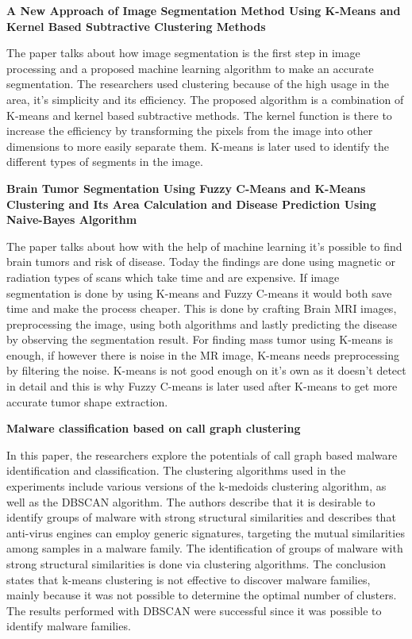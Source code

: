 \documentclass[a4paper]{article}
\begin{document}
\textbf{A New Approach of Image Segmentation Method Using K-Means and
Kernel Based Subtractive Clustering Methods}\cite{imageSeg}

The paper talks about how image segmentation is the first step in image processing and a proposed machine learning algorithm to make an accurate segmentation. The researchers used clustering because of the high usage in the area, it's simplicity and its efficiency. The proposed algorithm is a combination of K-means and kernel based subtractive methods. The kernel function is there to increase the efficiency by transforming the pixels from the image into other dimensions to more easily separate them. K-means is later used to identify the different types of segments in the image.

\newpage
\textbf{Brain Tumor Segmentation Using Fuzzy
C-Means and K-Means Clustering and Its
Area Calculation and Disease Prediction Using
Naive-Bayes Algorithm}\cite{imageSegBrain}

The paper talks about how with the help of machine learning it's possible to find brain tumors and risk of disease. Today the findings are done using magnetic or radiation types of scans which take time and are expensive. If image segmentation is done by using K-means and Fuzzy C-means it would both save time and make the process cheaper. This is done by crafting Brain MRI images, preprocessing the image, using both algorithms and lastly predicting the disease by observing the segmentation result. For finding mass tumor using K-means is enough, if however there is noise in the MR image, K-means needs preprocessing by filtering the noise. K-means is not good enough on it's own as it doesn't detect in detail and this is why Fuzzy C-means is later used after K-means to get more accurate tumor shape extraction.

\textbf{Malware classification based on call graph clustering}\cite{Kinable2011MalwareCB}

In this paper, the researchers explore the potentials of call graph based
malware identification and classification. The clustering algorithms used in the experiments include various versions of the k-medoids clustering algorithm, as well as the DBSCAN algorithm. The authors describe that it is desirable to identify groups of malware with strong structural similarities and describes that anti-virus engines can employ generic signatures, targeting the mutual similarities among samples in a malware family. The identification of groups of malware with strong structural similarities is done via clustering algorithms. 
The conclusion states that k-means clustering is not effective to discover malware families, mainly because it was not possible to determine the optimal number of clusters. The results performed with DBSCAN were successful since it was possible to identify malware families.
\end{document}
